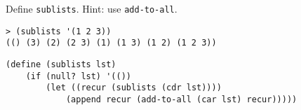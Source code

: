 \begin{blocksection}
\question Define \lstinline$sublists$. Hint: use \lstinline$add-to-all$.

\begin{lstlisting}
> (sublists '(1 2 3))
(() (3) (2) (2 3) (1) (1 3) (1 2) (1 2 3))
\end{lstlisting}

\begin{solution}[1.5in]
\begin{lstlisting}
(define (sublists lst)
    (if (null? lst) '(())
        (let ((recur (sublists (cdr lst))))
            (append recur (add-to-all (car lst) recur)))))
\end{lstlisting}
\end{solution}
\end{blocksection}
